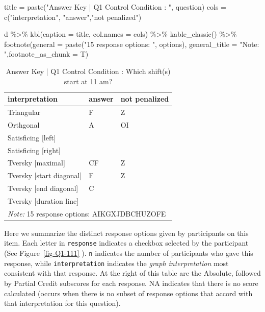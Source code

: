 \documentclass[
  letterpaper,
  DIV=11,
  numbers=noendperiod]{scrreprt}
\newenvironment{Shaded}{\begin{snugshade}}{\end{snugshade}}
\newcommand{\AttributeTok}[1]{\textcolor[rgb]{0.40,0.45,0.13}{#1}}
\newcommand{\FunctionTok}[1]{\textcolor[rgb]{0.28,0.35,0.67}{#1}}
\newcommand{\NormalTok}[1]{\textcolor[rgb]{0.00,0.23,0.31}{#1}}
\newcommand{\OtherTok}[1]{\textcolor[rgb]{0.00,0.23,0.31}{#1}}
\newcommand{\SpecialCharTok}[1]{\textcolor[rgb]{0.37,0.37,0.37}{#1}}
\newcommand{\StringTok}[1]{\textcolor[rgb]{0.13,0.47,0.30}{#1}}
\begin{document}
\begin{Shaded}
\begin{Highlighting}[]
\NormalTok{title }\OtherTok{=} \FunctionTok{paste}\NormalTok{(}\StringTok{"Answer Key | Q1 Control Condition : "}\NormalTok{, question)}
\NormalTok{cols }\OtherTok{=} \FunctionTok{c}\NormalTok{(}\StringTok{"interpretation"}\NormalTok{, }\StringTok{"answer"}\NormalTok{,}\StringTok{"not penalized"}\NormalTok{)}

\NormalTok{d }\SpecialCharTok{\%\textgreater{}\%} \FunctionTok{kbl}\NormalTok{(}\AttributeTok{caption =}\NormalTok{ title, }\AttributeTok{col.names =}\NormalTok{ cols) }\SpecialCharTok{\%\textgreater{}\%} \FunctionTok{kable\_classic}\NormalTok{() }\SpecialCharTok{\%\textgreater{}\%} 
  \FunctionTok{footnote}\NormalTok{(}\AttributeTok{general =} \FunctionTok{paste}\NormalTok{(}\StringTok{"15 response options: "}\NormalTok{, options), }\AttributeTok{general\_title =} \StringTok{"Note: "}\NormalTok{,}\AttributeTok{footnote\_as\_chunk =}\NormalTok{ T) }
\end{Highlighting}
\end{Shaded}

\begin{table}

\caption{Answer Key | Q1 Control Condition :  Which shift(s) start at 11 am?}
\centering
\begin{tabular}[t]{l|l|l}
\hline
interpretation & answer & not penalized\\
\hline
Triangular & F & Z\\
\hline
Orthgonal & A & OI\\
\hline
Satisficing [left] &  & \\
\hline
Satisficing [right] &  & \\
\hline
Tversky [maximal] & CF & Z\\
\hline
Tversky [start diagonal] & F & Z\\
\hline
Tversky [end diagonal] & C & \\
\hline
Tversky [duration line] &  & \\
\hline
\multicolumn{3}{l}{\rule{0pt}{1em}\textit{Note: } 15 response options:  AIKGXJDBCHUZOFE}\\
\end{tabular}
\end{table}

Here we summarize the distinct response options given by participants on
this item. Each letter in \texttt{response} indicates a checkbox
selected by the participant (See Figure~\ref{fig-Q1-111} ). \texttt{n}
indicates the number of participants who gave this response, while
\texttt{interpretation} indicates the \emph{graph interpretation} most
consistent with that response. At the right of this table are the
Absolute, followed by Partial Credit subscores for each response. NA
indicates that there is no score calculated (occurs when there is no
subset of response options that accord with that interpretation for this
question).
\end{document}
